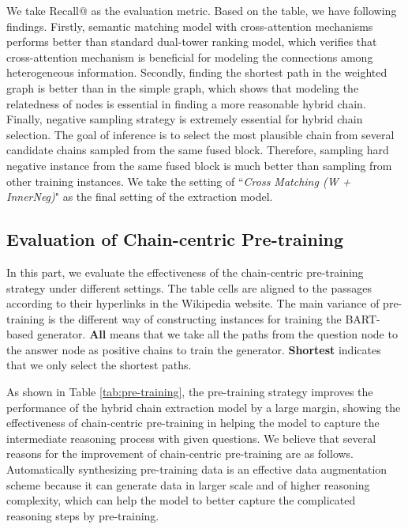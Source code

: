 \documentclass[11pt]{article}
\begin{document}
	We take Recall@ as the evaluation metric.  
	Based on the table, we have following findings.
	Firstly, semantic matching model with cross-attention mechanisms performs better than standard dual-tower ranking model, which verifies that cross-attention mechanism is beneficial for modeling the connections among heterogeneous information.
	Secondly, finding the shortest path in the weighted graph is better than in the simple graph, which shows that modeling the relatedness of nodes is essential in finding a more reasonable hybrid chain.
	Finally, negative sampling strategy is extremely essential for hybrid chain selection. 
	The goal of inference is to select the most plausible chain from several candidate chains sampled from the same fused block. Therefore, sampling hard negative instance from the same fused block is much better than sampling from other training instances.  We take the setting of ``\textit{Cross Matching (W + InnerNeg)}" as the final setting of the extraction model.
	\subsection{Evaluation of Chain-centric Pre-training}
	In this part, we evaluate the effectiveness of the chain-centric pre-training strategy under different settings. 
The table cells are aligned to the passages according to their hyperlinks in the Wikipedia website. 
	The main variance of pre-training is the different way of constructing instances for training the BART-based generator. \textbf{All} means that we take all the paths from the question node to the answer node as positive chains to train the generator. \textbf{Shortest} indicates that we only select the shortest paths. 
	
	As shown in Table \ref{tab:pre-training}, the pre-training strategy improves the performance of the hybrid chain extraction model by a large margin, showing the effectiveness of chain-centric pre-training in helping the model to capture the intermediate reasoning process with given questions. 
We believe that several reasons for the improvement of chain-centric pre-training are as follows.
Automatically synthesizing pre-training data is an effective data augmentation scheme because it can generate data in larger scale and of higher reasoning complexity, which can help the model to better capture the complicated reasoning steps by pre-training. 
\end{document}
